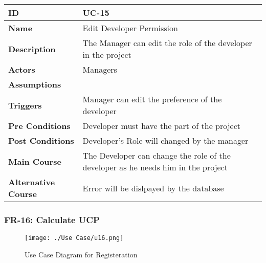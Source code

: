     \begin{center}
        \begin{tabularx}{\textwidth}{|l|X|}
            \hline
            \textbf{ID} & UC-15 \\
            \hline
            \textbf{Name} & Edit Developer Permission \\
            \hline
            \textbf{Description} & The Manager can edit the role of the developer in the project \\
            \hline
            \textbf{Actors} & Managers \\
            \hline
            \textbf{Assumptions} &  \\
            \hline
            \textbf{Triggers} & Manager can edit the preference of the developer \\
            \hline
            \textbf{Pre Conditions} & Developer must have the part of the project \\
            \hline
            \textbf{Post Conditions} & Developer's Role will changed by the manager \\
            \hline
            \textbf{Main Course} & The Developer can change the role of the developer as he needs him in the project \\
            \hline
            \textbf{Alternative Course} & Error will be dislpayed by the database \\
            \hline
            
        \end{tabularx}
    \end{center}
    \newpage
    

    \subsubsection{FR-16: Calculate UCP}
    \begin{figure}[H]
        \texttt{[image: ./Use Case/u16.png]}
        \centering 
        \caption{Use Case Diagram for Registeration}
        \label{fig:prototype1}
        \end{figure}
        
